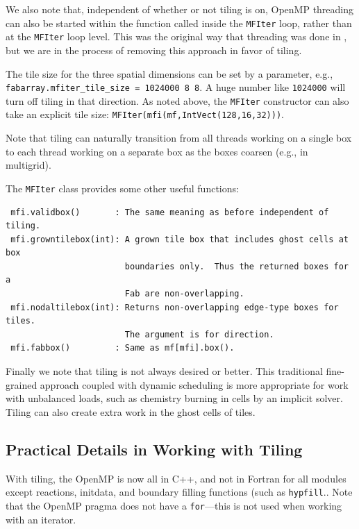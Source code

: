 We also note that, independent of whether or not tiling is on, OpenMP
threading can also be started within the function called inside the
{\tt MFIter} loop, rather than at the {\tt MFIter} loop level.  This
was the original way that threading was done in \castro, but we are in
the process of removing this approach in favor of tiling.

The tile size for the three spatial dimensions can be set by a
parameter, e.g., {\tt fabarray.mfiter\_tile\_size = 1024000 8 8}.  A
huge number like {\tt 1024000} will turn off tiling in that direction.
As noted above, the {\tt MFIter} constructor can also take an explicit
tile size: {\tt MFIter(mfi(mf,IntVect(128,16,32)))}.

Note that tiling can naturally transition from all threads working
on a single box to each thread working on a separate box as the boxes
coarsen (e.g., in multigrid).

The {\tt MFIter} class provides some other useful functions:
\begin{lstlisting}
 mfi.validbox()       : The same meaning as before independent of tiling.
 mfi.growntilebox(int): A grown tile box that includes ghost cells at box
                        boundaries only.  Thus the returned boxes for a
                        Fab are non-overlapping.
 mfi.nodaltilebox(int): Returns non-overlapping edge-type boxes for tiles.
                        The argument is for direction.
 mfi.fabbox()         : Same as mf[mfi].box().
\end{lstlisting}

Finally we note that tiling is not always desired or better.  This
traditional fine-grained approach coupled with dynamic scheduling is
more appropriate for work with unbalanced loads, such as chemistry
burning in cells by an implicit solver.  Tiling can also create extra
work in the ghost cells of tiles.


\subsection{Practical Details in Working with Tiling}

With tiling, the OpenMP is now all in C++, and not in Fortran for all
modules except reactions, initdata, and boundary filling functions
(such as {\tt hypfill}..  Note that the OpenMP pragma does not have a
{\tt for}---this is not used when working with an iterator.

